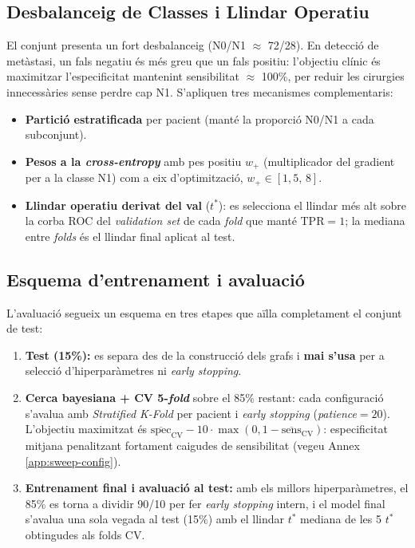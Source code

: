 \documentclass[10pt,a4paper,twocolumn,twoside]{article}
\begin{document}
\subsection{Desbalanceig de Classes i Llindar Operatiu}

El conjunt presenta un fort desbalanceig (N0/N1 $\approx$ 72/28). En detecció de metàstasi, un
fals negatiu és més greu que un fals positiu: l'objectiu clínic és maximitzar
l'especificitat mantenint sensibilitat $\approx$ 100\%, per reduir les cirurgies innecessàries
sense perdre cap N1. S'apliquen tres mecanismes complementaris:
\begin{itemize}\itemsep1pt
  \item \textbf{Partició estratificada} per pacient (manté la proporció N0/N1 a cada subconjunt).
  \item \textbf{Pesos a la \textit{cross-entropy}} amb pes positiu $w_+$ (multiplicador del
        gradient per a la classe N1) com a eix d'optimització, $w_+ \in [1{,}5,\,8]$.
  \item \textbf{Llindar operatiu derivat del val} ($t^*$): es selecciona el llindar més alt
        sobre la corba ROC del \textit{validation set} de cada \textit{fold} que manté
        TPR$=1$; la mediana entre \textit{folds} és el llindar final aplicat al test.
\end{itemize}

\subsection{Esquema d'entrenament i avaluació}
\label{sec:training-scheme}

L'avaluació segueix un esquema en tres etapes que aïlla completament el conjunt de test:

\begin{enumerate}\itemsep1pt
  \item \textbf{Test (15\%):} es separa des de la construcció dels grafs i \textbf{mai
        s'usa} per a selecció d'hiperparàmetres ni \textit{early stopping}.
  \item \textbf{Cerca bayesiana + CV 5-\textit{fold}} sobre el 85\% restant: cada configuració
        s'avalua amb \textit{Stratified K-Fold} per pacient i \textit{early stopping}
        (\textit{patience}$=\!20$). L'objectiu maximitzat és
        $\overline{\text{spec}}_{\text{CV}} - 10\cdot\max(0, 1-\overline{\text{sens}}_{\text{CV}})$:
        especificitat mitjana penalitzant fortament caigudes de sensibilitat (vegeu Annex
        \ref{app:sweep-config}).
  \item \textbf{Entrenament final i avaluació al test:} amb els millors hiperparàmetres,
        el 85\% es torna a dividir 90/10 per fer \textit{early stopping} intern, i el model
        final s'avalua una sola vegada al test (15\%) amb el llindar $t^*$ mediana de les 5
        $t^*$ obtingudes als folds CV.
\end{enumerate}
\end{document}
